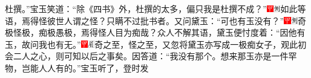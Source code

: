 杜撰。''宝玉笑道：``除《四书》外，杜撰的太多，偏只我是杜撰不成？''{\includegraphics[width=3mm]{../Images/00002}\includegraphics[width=3mm]{../Images/00011}\footnotesize \kaishu 如此等语，焉得怪彼世人谓之怪？只瞒不过批书者。}又问黛玉：``可也有玉没有？''{\includegraphics[width=3mm]{../Images/00002}\includegraphics[width=3mm]{../Images/00011}\footnotesize \kaishu 奇极怪极，痴极愚极，焉得怪人目为痴哉？}众人不解其语，黛玉便忖度着：``因他有玉，故问我也有无。''{\includegraphics[width=3mm]{../Images/00002}\includegraphics[width=3mm]{../Images/00010}\footnotesize \kaishu 奇之至，怪之至，又忽将黛玉亦写成一极痴女子，观此初会二人之心，则可知以后之事矣。}因答道：``我没有那个。想来那玉亦是一件罕物，岂能人人有的。''宝玉听了，登时发